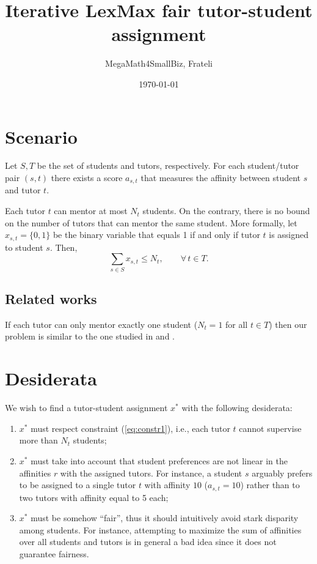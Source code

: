 \documentclass[11pt,oneside,a4paper]{article}     %
\title{Iterative LexMax fair tutor-student assignment}
\date{\today}
\author{MegaMath4SmallBiz, Frateli}
\begin{document}
\maketitle


\section{Scenario}

Let $S,T$ be the set of students and tutors, respectively. For each student/tutor pair $(s,t)$ there exists a score $a_{s,t}$ that measures the affinity between student $s$ and tutor $t$.

Each tutor $t$ can mentor at most $N_t$ students. On the contrary, there is no bound on the number of tutors that can mentor the same student. More formally, let $x_{s,t}=\{0,1\}$ be the binary variable that equals 1 if and only if tutor $t$ is assigned to student $s$. Then, 
\begin{equation} \label{eq:constr1}
\sum_{s\in S} x_{s,t} \le N_t, \qquad \forall\, t\in T.
\end{equation}



\subsection{Related works}

If each tutor can only mentor exactly one student ($N_t=1$ for all $t\in T$) then our problem is similar to the one studied in \cite{santaclaus06} and  \cite{chakrabarty2009allocating}. 



\section{Desiderata}

We wish to find a tutor-student assignment $x^*$ with the following desiderata:
\begin{enumerate}
\item $x^*$ must respect constraint (\ref{eq:constr1}), i.e., each tutor $t$ cannot supervise more than $N_t$ students;
\item $x^*$ must take into account that student preferences are not linear in the affinities $r$ with the assigned tutors. For instance, a student $s$ arguably prefers to be assigned to a single tutor $t$ with affinity $10$ ($a_{s,t}=10$) rather than to two tutors with affinity equal to 5 each;
\item $x^*$ must be somehow ``fair'', thus it should intuitively avoid stark disparity among students. For instance, attempting to maximize the sum of affinities over all students and tutors is in general a bad idea since it does not guarantee fairness.
\end{enumerate}
\end{document}
